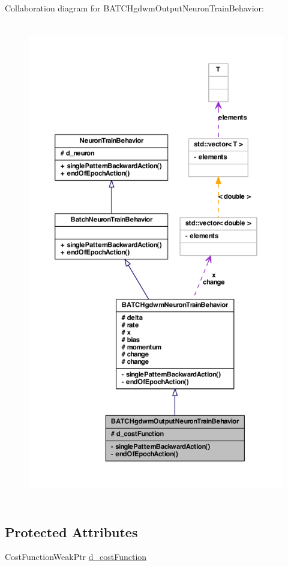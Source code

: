 Collaboration diagram for BATCHgdwmOutputNeuronTrainBehavior:
\nopagebreak
\begin{figure}[H]
\begin{center}
\leavevmode
\includegraphics[height=600pt]{class_b_a_t_c_hgdwm_output_neuron_train_behavior__coll__graph}
\end{center}
\end{figure}
\subsection*{Protected Attributes}
\begin{DoxyCompactItemize}
\item 
CostFunctionWeakPtr \hyperlink{class_b_a_t_c_hgdwm_output_neuron_train_behavior_a9499a75b8368d124744de1c36b8ae1be}{d\_\-costFunction}
\end{DoxyCompactItemize}

